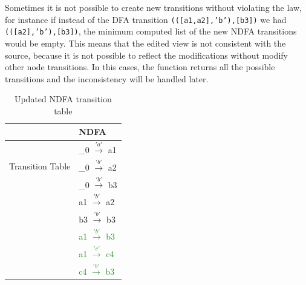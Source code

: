 Sometimes it is not possible to create new transitions without violating the law, for instance if instead of the DFA transition \texttt{(([a1,a2],'b'),[b3])} we had \texttt{(([a2],'b'),[b3])}, the minimum computed list of the new NDFA transitions would be empty. This means that the edited view is not consistent with the source, because it is not possible to reflect the modifications without modify other node transitions. In this cases, the function returns all the possible transitions and the inconsistency will be handled later. 

\begin{table}
  \begin{center}
    \begin{tabular}{ | p{3cm} | p{4cm}|  }
    \hline
         & NDFA \\ [1ex]
        \hline
        \hline
        \multirow{3}{5em}{Transition Table} & \_0 $\xrightarrow{'a'}$ a1\\
        & \_0 $\xrightarrow{'b'}$ a2 \\
        & \_0 $\xrightarrow{'b'}$ b3 \\
        & a1  $\xrightarrow{'b'}$ a2 \\
        & b3  $\xrightarrow{'b'}$ b3 \\
        & \textcolor{ForestGreen}{a1  $\xrightarrow{'b'}$ b3} \\
        & \textcolor{ForestGreen}{a1  $\xrightarrow{'c'}$ c4} \\
        & \textcolor{ForestGreen}{c4  $\xrightarrow{'b'}$ b3} \\
        \hline
        \end{tabular}
  \end{center}
  \caption{Updated NDFA transition table}
  \label{getablefinal}
\end{table}


